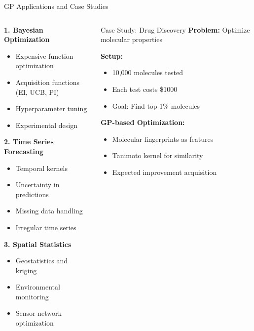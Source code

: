 \documentclass[aspectratio=169,11pt]{beamer}
\begin{document}
\begin{frame}{GP Applications and Case Studies}
\begin{columns}
\begin{column}{0.5\textwidth}
\textbf{1. Bayesian Optimization}
\begin{itemize}
\item Expensive function optimization
\item Acquisition functions (EI, UCB, PI)
\item Hyperparameter tuning
\item Experimental design
\end{itemize}

\textbf{2. Time Series Forecasting}
\begin{itemize}
\item Temporal kernels
\item Uncertainty in predictions
\item Missing data handling
\item Irregular time series
\end{itemize}

\textbf{3. Spatial Statistics}
\begin{itemize}
\item Geostatistics and kriging
\item Environmental monitoring
\item Sensor network optimization
\end{itemize}
\end{column}
\begin{column}{0.5\textwidth}
\begin{block}{Case Study: Drug Discovery}
\textbf{Problem:} Optimize molecular properties

\textbf{Setup:}
\begin{itemize}
\item 10,000 molecules tested
\item Each test costs \$1000
\item Goal: Find top 1\% molecules
\end{itemize}

\textbf{GP-based Optimization:}
\begin{itemize}
\item Molecular fingerprints as features
\item Tanimoto kernel for similarity
\item Expected improvement acquisition
\end{itemize}


\end{block}
\end{column}
\end{columns}
\end{frame}
\end{document}
